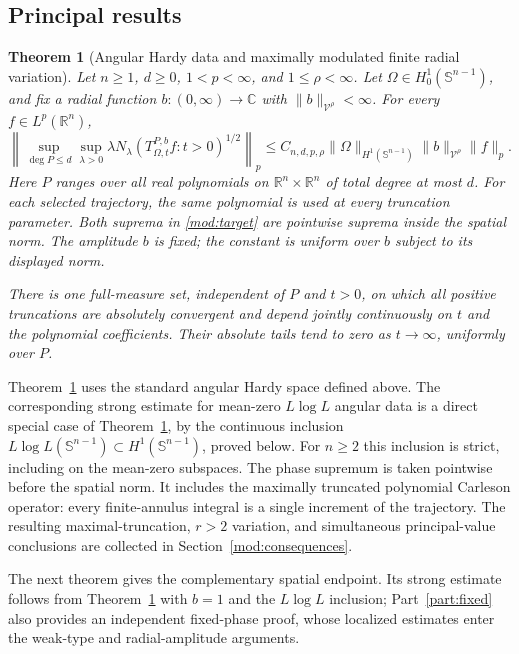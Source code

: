 \documentclass[11pt]{article}
\numberwithin{equation}{section}
\newtheorem{theorem}{Theorem}[section]
\theoremstyle{remark}
\theoremstyle{definition}
\begin{document}
\subsection{Principal results}\label{intro:results}
\begin{theorem}[Angular Hardy data and maximally modulated finite radial variation]
\label{mod:main}
Let $n\ge1$, $d\ge0$, $1<p<\infty$, and $1\le\rho<\infty$.
Let $\Omega\in H^1_0(\mathbb S^{n-1})$, and fix a radial function
$b:(0,\infty)\to\mathbb C$ with $\|b\|_{\mathcal V^\rho}<\infty$.
For every $f\in L^p(\mathbb R^n)$,
\begin{equation}\label{mod:target}
 \left\|\sup_{\deg P\le d}\sup_{\lambda>0}
  \lambda N_\lambda(T^{P,b}_{\Omega,t}f:t>0)^{1/2}\right\|_p
 \le C_{n,d,p,\rho}\|\Omega\|_{H^1(\mathbb S^{n-1})}
       \|b\|_{\mathcal V^\rho}\|f\|_p.
\end{equation}
Here $P$ ranges over all real polynomials on
$\mathbb R^n\times\mathbb R^n$ of total degree at most $d$.
For each selected trajectory, the same polynomial is used at every
truncation parameter. Both suprema in \eqref{mod:target} are pointwise
suprema inside the spatial norm. The amplitude $b$ is fixed; the
constant is uniform over $b$ subject to its displayed norm.

There is one full-measure set, independent of $P$ and $t>0$, on which
all positive truncations are absolutely convergent and depend jointly
continuously on $t$ and the polynomial coefficients. Their absolute
tails tend to zero as $t\to\infty$, uniformly over $P$.
\end{theorem}

Theorem~\ref{mod:main} uses the standard angular Hardy space defined
above. The corresponding strong estimate for mean-zero $L\log L$ angular
data is a direct special case of Theorem~\ref{mod:main}, by the continuous inclusion
$L\log L(\mathbb S^{n-1})\subset H^1(\mathbb S^{n-1})$, proved below.
For $n\ge2$ this inclusion is strict, including on the mean-zero
subspaces. The phase supremum is taken pointwise before the spatial norm. It includes the maximally truncated polynomial
Carleson operator: every finite-annulus integral is a single increment
of the trajectory. The resulting maximal-truncation, $r>2$ variation, and simultaneous
principal-value conclusions are collected in
Section~\ref{mod:consequences}.

The next theorem gives the complementary spatial endpoint. Its strong
estimate follows from Theorem~\ref{mod:main} with $b=1$ and the
$L\log L$ inclusion; Part~\ref{part:fixed}
also provides an independent fixed-phase proof, whose localized
estimates enter the weak-type and radial-amplitude arguments.
\end{document}
